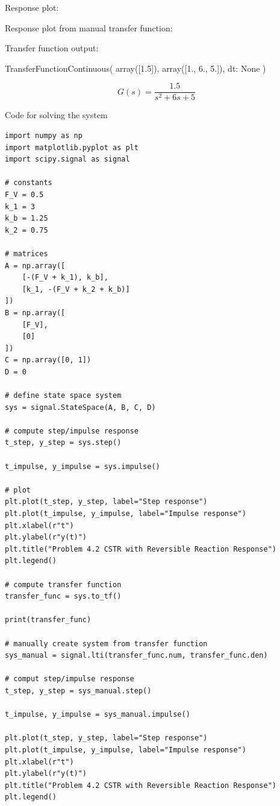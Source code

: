 \documentclass[12pt]{article}
\begin{document}
\begin{enumerate}
\begin{enumerate}
    Response plot:

    

    Response plot from manual transfer function:

    

    Transfer function output:

    TransferFunctionContinuous(
    array([1.5]),
    array([1., 6., 5.]),
    dt: None
    )

    \[
        G(s) = \frac{1.5}{s^2 + 6s + 5}
    \]

Code for solving the system

\begin{verbatim}
import numpy as np
import matplotlib.pyplot as plt
import scipy.signal as signal

# constants
F_V = 0.5
k_1 = 3
k_b = 1.25
k_2 = 0.75

# matrices
A = np.array([
    [-(F_V + k_1), k_b],
    [k_1, -(F_V + k_2 + k_b)]
])
B = np.array([
    [F_V],
    [0]
])
C = np.array([0, 1])
D = 0

# define state space system
sys = signal.StateSpace(A, B, C, D)

# compute step/impulse response
t_step, y_step = sys.step()

t_impulse, y_impulse = sys.impulse()

# plot
plt.plot(t_step, y_step, label="Step response")
plt.plot(t_impulse, y_impulse, label="Impulse response")
plt.xlabel(r"t")
plt.ylabel(r"y(t)")
plt.title("Problem 4.2 CSTR with Reversible Reaction Response")
plt.legend()

# compute transfer function
transfer_func = sys.to_tf()

print(transfer_func)

# manually create system from transfer function
sys_manual = signal.lti(transfer_func.num, transfer_func.den)

# comput step/impulse response
t_step, y_step = sys_manual.step()

t_impulse, y_impulse = sys_manual.impulse()

plt.plot(t_step, y_step, label="Step response")
plt.plot(t_impulse, y_impulse, label="Impulse response")
plt.xlabel(r"t")
plt.ylabel(r"y(t)")
plt.title("Problem 4.2 CSTR with Reversible Reaction Response")
plt.legend()
\end{verbatim}
\end{enumerate}



\end{enumerate}
\end{document}
